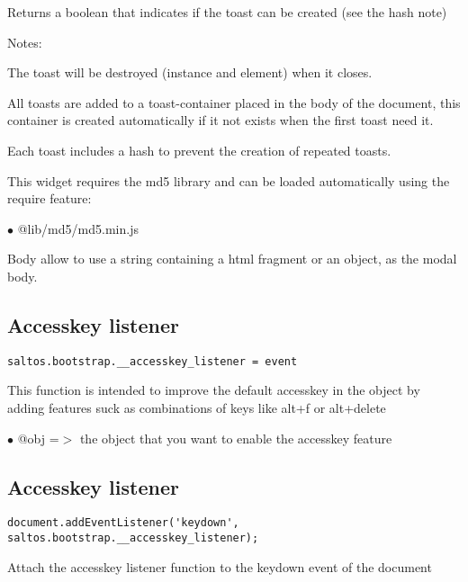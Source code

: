 \documentclass[a4paper]{book}
\begin{document}
Returns a boolean that indicates if the toast can be created (see the hash note)

Notes:

The toast will be destroyed (instance and element) when it closes.

All toasts are added to a toast-container placed in the body of the document, this container
is created automatically if it not exists when the first toast need it.

Each toast includes a hash to prevent the creation of repeated toasts.

This widget requires the md5 library and can be loaded automatically using the require
feature:

\begin{compactitem}
\item[\color{myblue}$\bullet$] @lib/md5/md5.min.js
\end{compactitem}

Body allow to use a string containing a html fragment or an object, as the modal body.

\hypertarget{toc505}{}
\subsection{Accesskey listener}

\begin{lstlisting}
saltos.bootstrap.__accesskey_listener = event
\end{lstlisting}

This function is intended to improve the default accesskey in the object by
adding features suck as combinations of keys like alt+f or alt+delete

\begin{compactitem}
\item[\color{myblue}$\bullet$] @obj =$>$ the object that you want to enable the accesskey feature
\end{compactitem}

\hypertarget{toc506}{}
\subsection{Accesskey listener}

\begin{lstlisting}
document.addEventListener('keydown', saltos.bootstrap.__accesskey_listener);
\end{lstlisting}

Attach the accesskey listener function to the keydown event of the document
\end{document}
